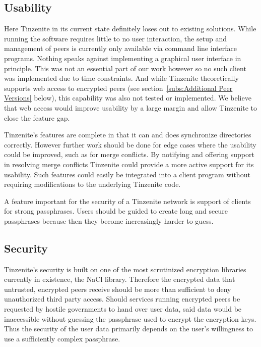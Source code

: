 \subsection{Usability}
\label{sub:Usability}

Here Tinzenite in its current state definitely loses out to existing solutions.
While running the software requires little to no user interaction, the setup and management of peers is currently only available via command line interface programs.
Nothing speaks against implementing a graphical user interface in principle.
This was not an essential part of our work however so no such client was implemented due to time constraints.
And while Tinzenite theoretically supports web access to encrypted peers (see section~\ref{subs:Additional Peer Versions} below), this capability was also not tested or implemented.
We believe that web access would improve usability by a large margin and allow Tinzenite to close the feature gap.

Tinzenite's features are complete in that it can and does synchronize directories correctly.
However further work should be done for edge cases where the usability could be improved, such as for merge conflicts.
By notifying and offering support in resolving merge conflicts Tinzenite could provide a more active support for its usability.
Such features could easily be integrated into a client program without requiring modifications to the underlying Tinzenite code.

A feature important for the security of a Tinzenite network is support of clients for strong passphrases.
Users should be guided to create long and secure passphrases because then they become increasingly harder to guess.

\subsection{Security}
\label{sub:Security}

Tinzenite's security is built on one of the most scrutinized encryption libraries currently in existence, the NaCl library.
Therefore the encrypted data that untrusted, encrypted peers receive should be more than sufficient to deny unauthorized third party access.
Should services running encrypted peers be requested by hostile governments to hand over user data, said data would be inaccessible without guessing the passphrase used to encrypt the encryption keys.
Thus the security of the user data primarily depends on the user's willingness to use a sufficiently complex passphrase.


